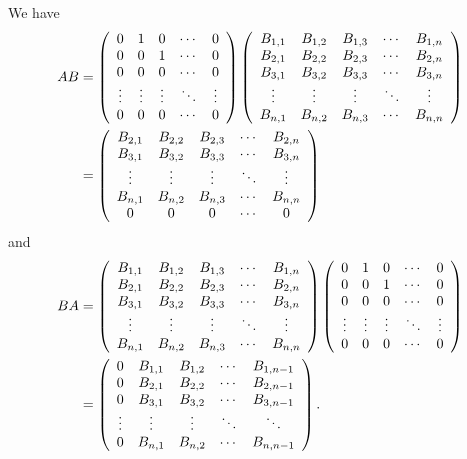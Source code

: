\documentclass[numbers=enddot,12pt,final,onecolumn,notitlepage]{scrartcl}%
\numberwithin{exer}{subsection}
\theoremstyle{definition}
\begin{document}
We have
\begin{align*}
AB  &  =\left(
\begin{array}
[c]{ccccc}%
0 & 1 & 0 & \cdots & 0\\
0 & 0 & 1 & \cdots & 0\\
0 & 0 & 0 & \cdots & 0\\
\vdots & \vdots & \vdots & \ddots & \vdots\\
0 & 0 & 0 & \cdots & 0
\end{array}
\right)  \left(
\begin{array}
[c]{ccccc}%
B_{1,1} & B_{1,2} & B_{1,3} & \cdots & B_{1,n}\\
B_{2,1} & B_{2,2} & B_{2,3} & \cdots & B_{2,n}\\
B_{3,1} & B_{3,2} & B_{3,3} & \cdots & B_{3,n}\\
\vdots & \vdots & \vdots & \ddots & \vdots\\
B_{n,1} & B_{n,2} & B_{n,3} & \cdots & B_{n,n}%
\end{array}
\right) \\
&  =\left(
\begin{array}
[c]{ccccc}%
B_{2,1} & B_{2,2} & B_{2,3} & \cdots & B_{2,n}\\
B_{3,1} & B_{3,2} & B_{3,3} & \cdots & B_{3,n}\\
\vdots & \vdots & \vdots & \ddots & \vdots\\
B_{n,1} & B_{n,2} & B_{n,3} & \cdots & B_{n,n}\\
0 & 0 & 0 & \cdots & 0
\end{array}
\right)
\end{align*}
and%
\begin{align*}
BA  &  =\left(
\begin{array}
[c]{ccccc}%
B_{1,1} & B_{1,2} & B_{1,3} & \cdots & B_{1,n}\\
B_{2,1} & B_{2,2} & B_{2,3} & \cdots & B_{2,n}\\
B_{3,1} & B_{3,2} & B_{3,3} & \cdots & B_{3,n}\\
\vdots & \vdots & \vdots & \ddots & \vdots\\
B_{n,1} & B_{n,2} & B_{n,3} & \cdots & B_{n,n}%
\end{array}
\right)  \left(
\begin{array}
[c]{ccccc}%
0 & 1 & 0 & \cdots & 0\\
0 & 0 & 1 & \cdots & 0\\
0 & 0 & 0 & \cdots & 0\\
\vdots & \vdots & \vdots & \ddots & \vdots\\
0 & 0 & 0 & \cdots & 0
\end{array}
\right) \\
&  =\left(
\begin{array}
[c]{ccccc}%
0 & B_{1,1} & B_{1,2} & \cdots & B_{1,n-1}\\
0 & B_{2,1} & B_{2,2} & \cdots & B_{2,n-1}\\
0 & B_{3,1} & B_{3,2} & \cdots & B_{3,n-1}\\
\vdots & \vdots & \vdots & \ddots & \ddots\\
0 & B_{n,1} & B_{n,2} & \cdots & B_{n,n-1}%
\end{array}
\right)  .
\end{align*}
\end{document}
